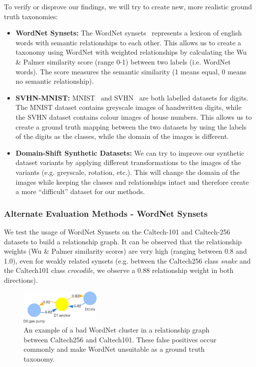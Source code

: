 To verify or disprove our findings, we will try to create new, more realistic ground truth taxonomies:
\begin{itemize}
      \item \textbf{WordNet Synsets:} The WordNet synsets~\cite{fellbaum_wordnet_1998,noauthor_wordnet_nodate}
            represents a lexicon of english words with semantic relationships to each other.
            This allows us to create a taxonomy using WordNet with weighted relationships by calculating
            the Wu \& Palmer similarity score (range 0-1) between two labels (i.e. WordNet words).
            The score measures the semantic similarity (1 means equal, 0 means no semantic relationship).
      \item \textbf{SVHN-MNIST:} MNIST~\cite{deng_mnist_2012} and SVHN~\cite{netzer_reading_2011} are both labelled datasets
            for digits. The MNIST dataset contains greyscale images of handwritten digits,
            while the SVHN dataset contains colour images of house numbers.
            This allows us to create a ground truth mapping between the two datasets
            by using the labels of the digits as the classes, while the domain of the images
            is different.
      \item \textbf{Domain-Shift Synthetic Datasets:} We can try to improve our synthetic dataset variants
            by applying different transformations to the images of the variants (e.g. greyscale, rotation, etc.).
            This will change the domain of the images while keeping the classes and relationships intact
            and therefore create a more \enquote{difficult} dataset for our methods.
\end{itemize}

\subsubsection{Alternate Evaluation Methods - WordNet Synsets} \label{sec:wordnet_synsets}

We test the usage of WordNet Synsets on the Caltech-101 and Caltech-256 datasets to build a relationship graph.
It can be observed that the relationship weights (Wu \& Palmer similarity scores) are very high (ranging between 0.8 and 1.0),
even for weakly related synsets (e.g. between the Caltech256 class \textit{snake} and the Caltech101 class \textit{crocodile},
we observe a 0.88 relationship weight in both directions).

\begin{figure}[ht]
      \centering
      \includegraphics[width=0.35\textwidth]{figures/wordnet.png}

      \caption{An example of a bad WordNet cluster in a relationship graph between Caltech256 and Caltech101.
            These false positives occur commonly and make WordNet unsuitable as a ground truth taxonomy.}
      \label{fig:wordnet}
\end{figure}

